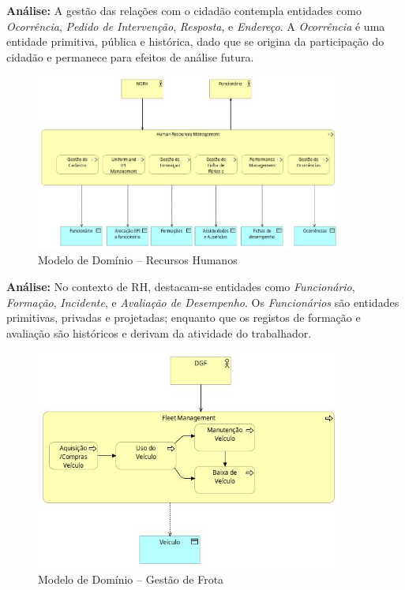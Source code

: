 \documentclass[12pt,a4paper,final]{article}
\begin{document}
    \textbf{Análise:} A gestão das relações com o cidadão contempla entidades como \textit{Ocorrência}, \textit{Pedido de Intervenção}, \textit{Resposta}, e \textit{Endereço}. A \textit{Ocorrência} é uma entidade primitiva, pública e histórica, dado que se origina da participação do cidadão e permanece para efeitos de análise futura.

    \begin{figure}[H]
        \centering
        \includegraphics[width=0.9\textwidth]{Q8 - Domain Model For Information Entities - Human Ressources Management.jpg}
        \caption{Modelo de Domínio – Recursos Humanos}
        \label{fig:q8-rh}
    \end{figure}

    \textbf{Análise:} No contexto de RH, destacam-se entidades como \textit{Funcionário}, \textit{Formação}, \textit{Incidente}, e \textit{Avaliação de Desempenho}. Os \textit{Funcionários} são entidades primitivas, privadas e projetadas; enquanto que os registos de formação e avaliação são históricos e derivam da atividade do trabalhador.

    \begin{figure}[H]
        \centering
        \includegraphics[width=0.9\textwidth]{Q8 - Domain Model For Information Entities - Fleet Management.jpg}
        \caption{Modelo de Domínio – Gestão de Frota}
        \label{fig:q8-frota}
    \end{figure}
\end{document}
